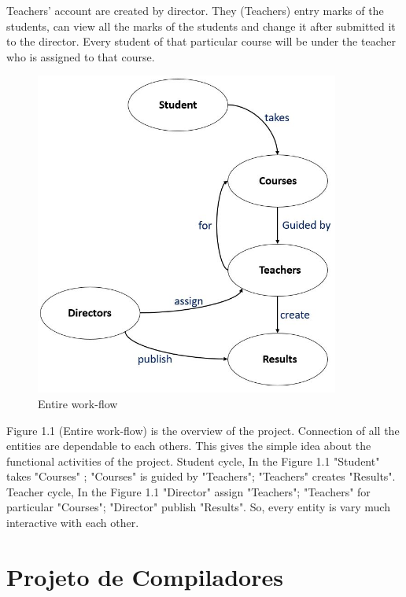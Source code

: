 \documentclass{scrreprt}
\begin{document}
Teachers' account are created by director. They (Teachers) entry marks of the students, can view all the marks of the students and change it after submitted it to the director. Every student of that particular course will be under the teacher who is assigned to that course. 
\newline
\begin{figure}
    \centering
    \includegraphics[width=10cm]{1.JPG}
    \caption{Entire work-flow}
    \label{fig:IICT WEBSITE}
\end{figure}
\newline
Figure 1.1 (Entire work-flow) is the overview of the project. Connection of all the entities are dependable to each others.  This gives the simple idea about the functional activities of the project. 
\newline
Student cycle, In the Figure 1.1 "Student" takes "Courses" ; "Courses" is guided by "Teachers"; "Teachers" creates "Results". 
\newline
Teacher cycle, In the Figure 1.1 "Director" assign "Teachers"; "Teachers" for particular "Courses"; "Director" publish "Results".
\newline
So, every entity is vary much interactive with each other.


\chapter{Projeto de Compiladores}
\end{document}
